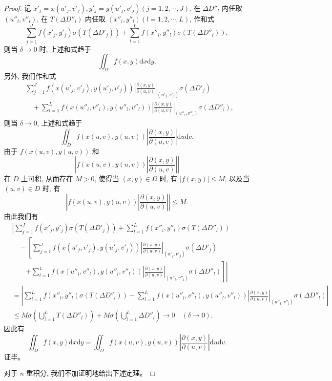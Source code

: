 \documentclass[12pt,fontset=fandol]{ctexart}
\begin{document}
\begin{proof}
记 $x'_j=x(u'_j,v'_j), y'_j=y(u'_j,v'_j)(j=1,2,\cdots,J)$. 在 $\Delta D''_l$ 内任取 $(u''_l,v''_l)$, 在 $T(\Delta D''_l)$ 内任取 $(x''_l,y''_l)(l=1,2,\cdots,L)$, 作和式
\begin{equation}
  \sum_{j=1}^J f(x'_j,y'_j)\sigma(T(\Delta D'_j))
  +\sum_{l=1}^L f(x''_l,y''_l)\sigma(T(\Delta D''_l)),
  \label{course-eq-15-4-1}
\end{equation}
则当 $\delta\to0$ 时, 上述和式趋于
\[
  \iint_\Omega f(x,y)\mathrm dx\mathrm dy.
\]
另外, 我们作和式
\begin{equation}
\begin{aligned}
  &\sum_{j=1}^J f(x(u'_j,v'_j),y(u'_j,v'_j))
  \left|\frac{\partial(x,y)}{\partial(u,v)}\right|_{(u'_j,v'_j)}
  \sigma(\Delta D'_j)\\
  &\quad+\sum_{l=1}^L f(x(u''_l,v''_l),y(u''_l,v''_l))
  \left|\frac{\partial(x,y)}{\partial(u,v)}\right|_{(u''_l,v''_l)}
  \sigma(\Delta D''_l),
\end{aligned}
  \label{course-eq-15-4-2}
\end{equation}
则当 $\delta\to0$, 上述和式趋于
\[
  \iint_D f(x(u,v),y(u,v))
  \left|\frac{\partial(x,y)}{\partial(u,v)}\right|\mathrm du\mathrm dv.
\]
由于 $f(x(u,v),y(u,v))$ 和
\[
  \left|f(x(u,v),y(u,v))\left|\frac{\partial(x,y)}{\partial(u,v)}\right|\right|
\]
在 $D$ 上可积, 从而存在 $M>0$, 使得当 $(x,y)\in\Omega$ 时, 有 $|f(x,y)|\leqslant M$, 以及当 $(u,v)\in D$ 时, 有
\[
  \left|f(x(u,v),y(u,v))\left|\frac{\partial(x,y)}{\partial(u,v)}\right|\right|\leqslant M.
\]
由此我们有
\[
\begin{aligned}
  &\left|
  \sum_{j=1}^J f(x'_j,y'_j)\sigma(T(\Delta D'_j))
  +\sum_{l=1}^L f(x''_l,y''_l)\sigma(T(\Delta D''_l))\right.\\
  &\quad-\left[
  \sum_{j=1}^J f(x(u'_j,v'_j),y(u'_j,v'_j))
  \left|\frac{\partial(x,y)}{\partial(u,v)}\right|_{(u'_j,v'_j)}
  \sigma(\Delta D'_j)\right.\\
  &\qquad\left.\left.
  +\sum_{l=1}^L f(x(u''_l,v''_l),y(u''_l,v''_l))
  \left|\frac{\partial(x,y)}{\partial(u,v)}\right|_{(u''_l,v''_l)}
  \sigma(\Delta D''_l)\right]\right|\\
  &=\left|
  \sum_{l=1}^L f(x''_l,y''_l)\sigma(T(\Delta D''_l))
  -\sum_{l=1}^L f(x(u''_l,v''_l),y(u''_l,v''_l))
  \left|\frac{\partial(x,y)}{\partial(u,v)}\right|_{(u''_l,v''_l)}
  \sigma(\Delta D''_l)\right|\\
  &\leqslant M\sigma\left(\bigcup_{l=1}^L T(\Delta D''_l)\right)
  +M\sigma\left(\bigcup_{l=1}^L\Delta D''_l\right)\to0\quad(\delta\to0).
\end{aligned}
\]
因此有
\[
  \iint_\Omega f(x,y)\mathrm dx\mathrm dy
  =\iint_D f(x(u,v),y(u,v))
  \left|\frac{\partial(x,y)}{\partial(u,v)}\right|\mathrm du\mathrm dv.
\]
证毕。

对于 $n$ 重积分, 我们不加证明地给出下述定理。

\end{proof}
\end{document}
